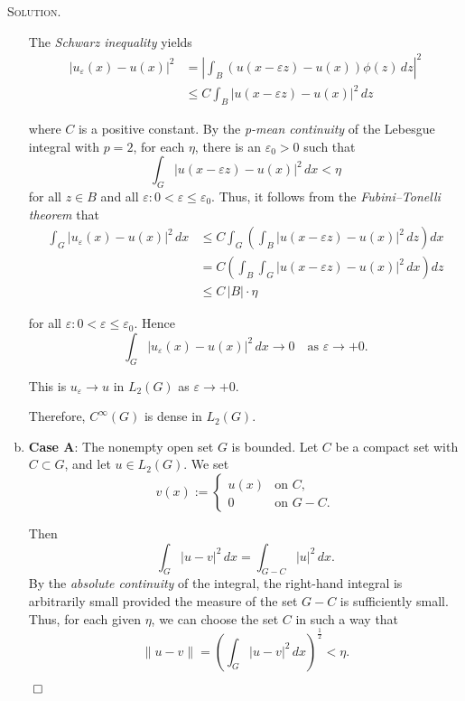 \documentclass[12pt, a4paper, oneside]{ctexart}
\newenvironment{solution}{%
	\par\noindent\textsc{Solution. }\ignorespaces
}{%
	\hfill$\qed$\par
}
\begin{document}
\begin{solution}
\begin{enumerate}[(a)]
			The \textit{Schwarz inequality} yields
			\begin{align*}
				|u_\varepsilon(x) - u(x)|^2 &=|\int_B (u(x - \varepsilon z) - u(x)) \phi(z) \, dz|^{2}\\&\leq C \int_B |u(x - \varepsilon z) - u(x)|^2 \, dz
			\end{align*}
			
			
			
			where \( C \) is a positive constant. By the \textit{p-mean continuity} of the Lebesgue integral with \( p = 2 \), for each \( \eta \), there is an \( \varepsilon_0 > 0 \) such that
			\[
			\int_G |u(x - \varepsilon z) - u(x)|^2 \, dx < \eta
			\]
			for all \( z \in B \) and all \( \varepsilon : 0 < \varepsilon \leq \varepsilon_0 \). Thus, it follows from the \textit{Fubini–Tonelli theorem} that
			\begin{align*}
				\int_G |u_\varepsilon(x) - u(x)|^2 \, dx &\leq C \int_G \left( \int_B |u(x - \varepsilon z) - u(x)|^2 \, dz \right) dx\\
				&= C \left( \int_B \int_G |u(x - \varepsilon z) - u(x)|^2 \, dx \right) dz \\&\leq C \, |B| \cdot \eta
			\end{align*}
			
			
			for all \( \varepsilon : 0 < \varepsilon \leq \varepsilon_0 \). Hence
			\[
			\int_G |u_\varepsilon(x) - u(x)|^2 \, dx \to 0 \quad \text{as } \varepsilon \to +0.
			\]
			
			This is $u_{\varepsilon}\to u$ in $L_{2}(G)$ as $\varepsilon\to+0$.
			
			Therefore, $C^{\infty}(G)$ is dense in $L_{2}(G)$.
			
			\item 
			\textbf{ Case A}: The nonempty open set \( G \) is bounded. Let \( C \) be a compact set with \( C \subset G \), and let \( u \in L_2(G) \). We set
			\[
			v(x) := 
			\begin{cases}
				u(x) & \text{on } C, \\
				0 & \text{on } G - C.
			\end{cases}
			\]
			
			Then
			\[
			\int_G |u - v|^2 \, dx = \int_{G - C} |u|^2 \, dx.
			\]
			By the \textit{absolute continuity} of the integral, the right-hand integral is arbitrarily small provided the measure of the set \( G - C \) is sufficiently small. Thus, for each given \( \eta \), we can choose the set \( C \) in such a way that
			\[
			\|u - v\| = \left( \int_G |u - v|^2 \, dx \right)^{\frac{1}{2}} < \eta.
			\]
			

\end{enumerate}
\end{solution}
\end{document}
